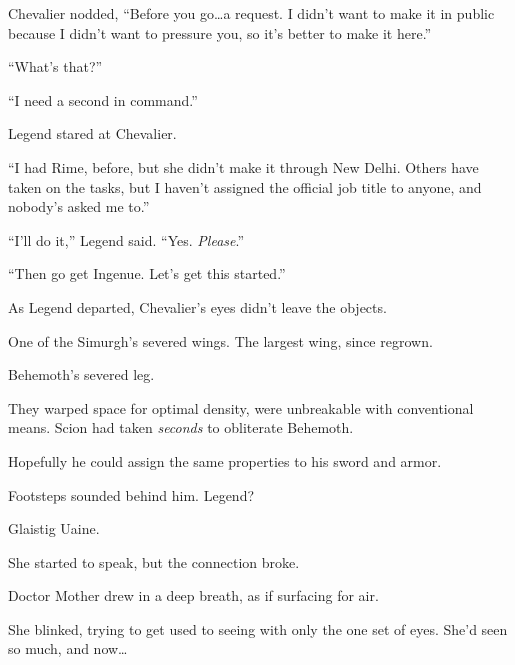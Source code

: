 Chevalier nodded, ``Before you go\ldots a request.  I didn't want to make it in public because I didn't want to pressure you, so it's better to make it here.''



``What's that?''



``I need a second in command.''



Legend stared at Chevalier.



``I had Rime, before, but she didn't make it through New Delhi.  Others have taken on the tasks, but I haven't assigned the official job title to anyone, and nobody's asked me to.''



``I'll do it,'' Legend said.  ``Yes.  \emph{Please}.''



``Then go get Ingenue.  Let's get this started.''



As Legend departed, Chevalier's eyes didn't leave the objects.



One of the Simurgh's severed wings.  The largest wing, since regrown.



Behemoth's severed leg.



They warped space for optimal density, were unbreakable with conventional means.  Scion had taken \emph{seconds} to obliterate Behemoth.



Hopefully he could assign the same properties to his sword and armor.



Footsteps sounded behind him.  Legend?



Glaistig Uaine.



She started to speak, but the connection broke.



\blacksquare



Doctor Mother drew in a deep breath, as if surfacing for air.



She blinked, trying to get used to seeing with only the one set of eyes.  She'd seen so much, and now\ldots



